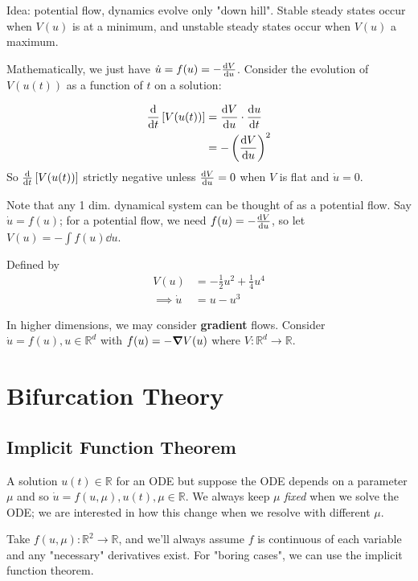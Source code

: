 \documentclass[12pt, oneside]{article}
\begin{document}
Idea: potential flow, dynamics evolve only "down hill". Stable steady states occur when $V(u)$ is at a minimum, and unstable steady states occur when $V(u)$ a maximum. 

Mathematically, we just have $\dot{u} = f(u) = - \dv{V}{u}$. Consider the evolution of $V(u(t))$ as a function of $t$ on a solution:

\begin{align*}
  \dv{t} \left[V(u(t))\right] &= \dv{V}{u} \cdot \dv{u}{t}\\
  &= - \left(\dv{V}{u}\right)^2
\end{align*}
So $\dv{t} \left[V(u(t))\right]$ strictly negative unless $\dv{V}{u} = 0$ when $V$ is flat and $\dot{u} =0$.

Note that any 1 dim. dynamical system can be thought of as a potential flow. Say $\dot{u} = f(u)$; for a potential flow, we need $f(u) = - \dv{V}{u}$, so let $V(u) = - \int f(u) \dd{u}$.

\begin{definition}
  Defined by \begin{align*}
    V(u) &= -\frac{1}{2}u^2 + \frac{1}{4}u^4\\
    \implies \dot{u} &= u - u^3
  \end{align*}
\end{definition}

In higher dimensions, we may consider \textbf{gradient} flows. Consider $\dot{u} = f(u), u \in \mathbb{R}^d$ with $f(u) = - \grad V(u)$ where $V: \mathbb{R}^d \to \mathbb{R}$.

\section{Bifurcation Theory}

\subsection{Implicit Function Theorem}

A solution $u(t) \in \mathbb{R}$ for an ODE but suppose the ODE depends on a parameter $\mu$ and so $\dot{u} = f(u, \mu), u(t), \mu \in \mathbb{R}$. We always keep $\mu$ \textit{fixed} when we solve the ODE; we are interested in how this change when we resolve  with different $\mu$.

Take $f(u,\mu) : \mathbb{R}^2 \to \mathbb{R}$, and we'll always assume $f$ is continuous of each variable and any "necessary" derivatives exist. For "boring cases", we can use the implicit function theorem.
\end{document}
